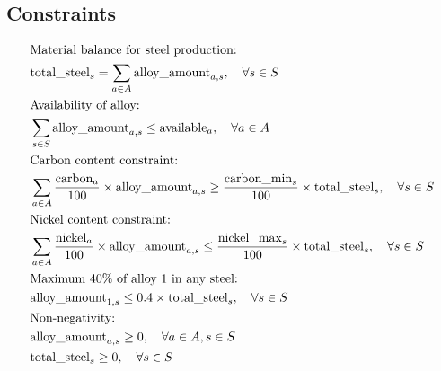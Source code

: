\documentclass{article}
\begin{document}
\subsection*{Constraints}
\begin{align}
& \text{Material balance for steel production:} \notag \\
& \text{total\_steel}_s = \sum_{a \in A} \text{alloy\_amount}_{a,s}, \quad \forall s \in S \\
& \text{Availability of alloy:} \notag \\
& \sum_{s \in S} \text{alloy\_amount}_{a,s} \leq \text{available}_a, \quad \forall a \in A \\
& \text{Carbon content constraint:} \notag \\
& \sum_{a \in A} \frac{\text{carbon}_a}{100} \times \text{alloy\_amount}_{a,s} \geq \frac{\text{carbon\_min}_s}{100} \times \text{total\_steel}_s, \quad \forall s \in S \\
& \text{Nickel content constraint:} \notag \\
& \sum_{a \in A} \frac{\text{nickel}_a}{100} \times \text{alloy\_amount}_{a,s} \leq \frac{\text{nickel\_max}_s}{100} \times \text{total\_steel}_s, \quad \forall s \in S \\
& \text{Maximum 40\% of alloy 1 in any steel:} \notag \\
& \text{alloy\_amount}_{1,s} \leq 0.4 \times \text{total\_steel}_s, \quad \forall s \in S \\
& \text{Non-negativity:} \notag \\
& \text{alloy\_amount}_{a,s} \geq 0, \quad \forall a \in A, s \in S \\
& \text{total\_steel}_s \geq 0, \quad \forall s \in S
\end{align}
\end{document}
